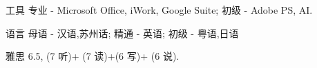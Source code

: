 \begin{cvskills}
  	\cvskill
    {工具}
    {专业 - Microsoft Office, iWork, Google Suite; 初级 - Adobe PS, AI.}
    
  	\cvskill
    {语言}
    {母语 - 汉语,苏州话; 精通 - 英语; 初级 - 粤语,日语}

	\cvskill
 	{雅思}
  	{6.5, (7 听)+ (7 读)+(6 写)+ (6 说).}
   
\end{cvskills}


